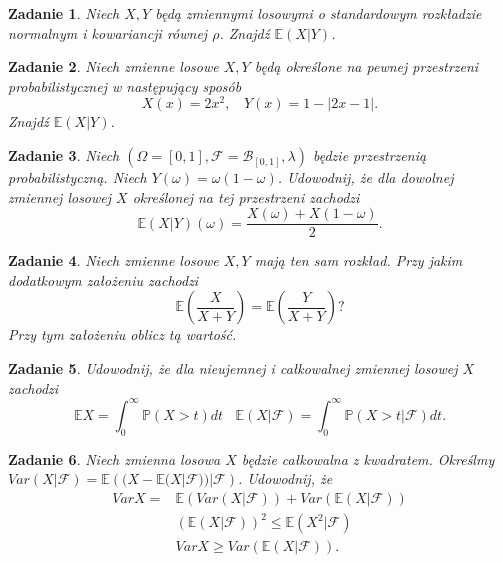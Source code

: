 \documentclass[12pt]{mwart}
\newtheorem{zd}{Zadanie}
\begin{document}
\begin{zd}
	Niech $X,Y$ będą zmiennymi losowymi o standardowym rozkładzie normalnym i kowariancji równej $\rho$. Znajdź $\mathbb{E}(X|Y)$.
\end{zd}
\begin{zd}
	Niech zmienne losowe $X,Y$ będą określone na pewnej przestrzeni probabilistycznej w następujący sposób
	\begin{displaymath}
	X (x) = 2x^2,\ \ \ \ Y (x) = 1 - |2x - 1|.
	\end{displaymath}
	Znajdź $\mathbb{E}(X|Y)$.
\end{zd}	
\begin{zd}
	Niech $(\Omega = [0,1], \mathcal{F} = \mathcal{B}_{[0,1]}, \lambda)$ będzie przestrzenią probabilistyczną. Niech $Y(\omega) = \omega(1-\omega)$. Udowodnij, że dla dowolnej zmiennej losowej $X$ określonej na tej przestrzeni zachodzi
	\begin{displaymath}
	 \mathbb{E}(X|Y)(\omega) = \frac{X(\omega) + X(1-\omega)}{2}.
	\end{displaymath}
\end{zd}	
\begin{zd}
	Niech zmienne losowe $X,Y$ mają ten sam rozkład. Przy jakim dodatkowym założeniu zachodzi
	\begin{displaymath}
		\mathbb{E}\left(\frac{X}{X+Y}\right) = \mathbb{E}\left(\frac{Y}{X+Y}\right)?
	\end{displaymath}
	Przy tym założeniu oblicz tą wartość.
\end{zd}
\begin{zd}
	Udowodnij, że dla nieujemnej i całkowalnej zmiennej losowej $X$ zachodzi
	\begin{displaymath}
	\mathbb{E}X = \int_0^{\infty}\mathbb{P}(X > t)dt \ \ \ \ \mathbb{E}(X|\mathcal{F}) = \int_0^{\infty}\mathbb{P}(X > t|\mathcal{F})dt.
	\end{displaymath}
\end{zd}
\begin{zd}
	Niech zmienna losowa $X$ będzie całkowalna z kwadratem. Określmy $Var (X|\mathcal{F}) = \mathbb{E}\left((X-\mathbb{E}(X|\mathcal{F}))|\mathcal{F}\right)$. Udowodnij, że 
	\begin{displaymath}
	\begin{split}
	VarX = &\mathbb{E}\left(Var(X|\mathcal{F})\right) + Var\left(\mathbb{E}(X|\mathcal{F})\right)\\ &\left(\mathbb{E}(X|\mathcal{F})\right)^2 \leq \mathbb{E}(X^2|\mathcal{F})\\
	& VarX \geq Var\left(\mathbb{E}(X|\mathcal{F})\right).
	\end{split}
	\end{displaymath}
\end{zd}	
\end{document}
